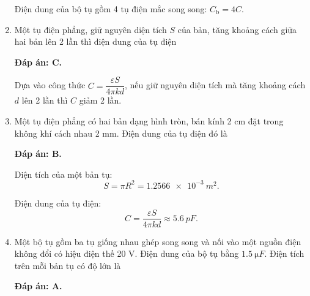 \begin{enumerate}[label=\bfseries Câu \arabic*:]
{		Điện dung của bộ tụ gồm 4 tụ điện mắc song song: $C_\text{b} = 4C$.
	}
	\item {}
	
	\cauhoi
	{Một tụ điện phẳng, giữ nguyên diện tích $S$ của bản, tăng khoảng cách giữa hai bản lên 2 lần thì điện dung của tụ điện
		
	}
	\loigiai
	{	\textbf{Đáp án: C.}
		
		Dựa vào công thức $C=\dfrac{\varepsilon S}{4\pi kd}$, nếu giữ nguyên diện tích mà tăng khoảng cách $d$ lên 2 lần thì $C$ giảm 2 lần.
	}
	\item {}
	
	\cauhoi
	{Một tụ điện phẳng có hai bản dạng hình tròn, bán kính 2 cm đặt trong không khí cách nhau 2 mm. Điện dung của tụ điện đó là
		
	}
	\loigiai
	{	\textbf{Đáp án: B.}
		
		Diện tích của một bản tụ:
		$$S=\pi R^2 = \SI{1.2566e-3}{m^2}.$$
		
		Điện dung của tụ điện:
		$$C=\dfrac{\varepsilon S}{4\pi kd} \approx \SI{5.6}{pF}.$$
	}
	\item {}
	
	\cauhoi
	{Một bộ tụ gồm ba tụ giống nhau ghép song song và nối vào một nguồn điện không đổi có hiệu điện thế 20 V. Điện dung của bộ tụ bằng $\SI{1.5}{\micro F}$. Điện tích trên mỗi bản tụ có độ lớn là
		
	}
	\loigiai
	{	\textbf{Đáp án: A.}
		
}
\end{enumerate}
